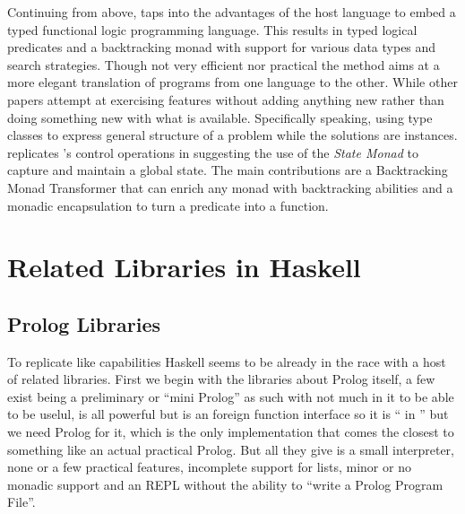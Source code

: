 \documentclass[thesis-solanki.tex]{subfiles}
\begin{document}
Continuing from above, \cite{claessen2000typed} taps into the advantages of the host language to embed a typed
functional logic programming language.
This results in typed logical predicates and a backtracking monad with support for various data types and search
strategies.
Though not very efficient nor practical the method aims at a more elegant translation of programs from one language
to the other.
While other papers \cite{erwig2004escape} attempt at exercising  features without adding
anything new rather than doing something new with what is available.
Specifically speaking, using  type classes to express general structure of a problem while the
solutions are instances.
\cite{hinze1998prological} replicates 's control operations in  suggesting the
use of the  \textit{State Monad} to capture and maintain a global state.
The main contributions are a Backtracking Monad Transformer that can enrich any monad with backtracking abilities
and a monadic encapsulation to turn a  predicate into a  function.



\section{Related Libraries in Haskell}
\subsection{Prolog Libraries}

To replicate like
capabilities Haskell seems to be already in the race
with a host of related libraries.
First we begin with the libraries about Prolog itself, a few exist \cite{nanoprolog-lib} being a preliminary or
``mini Prolog'' as such with not much in it to be able to be uselul, \cite{hswip-lib} is all powerful but is an
foreign function interface so it is `` in '' but we need Prolog for it,
\cite{prolog-lib} which is the only implementation that comes the closest to something like an actual practical
Prolog.
But all they give is a small interpreter, none or a few practical features, incomplete support for lists, minor or
no monadic support and an REPL without the ability to ``write a Prolog Program File''.
\end{document}
